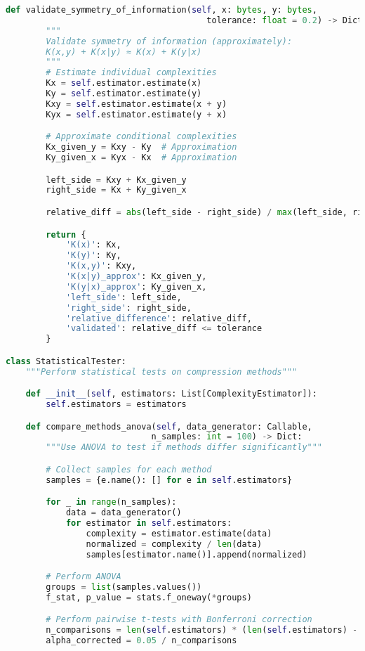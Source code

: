 \documentclass[12pt,a4paper]{report}
\begin{document}
\begin{lstlisting}[language=Python, caption=Validation Testing Protocol]
    def validate_symmetry_of_information(self, x: bytes, y: bytes,
                                        tolerance: float = 0.2) -> Dict:
        """
        Validate symmetry of information (approximately):
        K(x,y) + K(x|y) ≈ K(x) + K(y|x)
        """
        # Estimate individual complexities
        Kx = self.estimator.estimate(x)
        Ky = self.estimator.estimate(y)
        Kxy = self.estimator.estimate(x + y)
        Kyx = self.estimator.estimate(y + x)

        # Approximate conditional complexities
        Kx_given_y = Kxy - Ky  # Approximation
        Ky_given_x = Kyx - Kx  # Approximation

        left_side = Kxy + Kx_given_y
        right_side = Kx + Ky_given_x

        relative_diff = abs(left_side - right_side) / max(left_side, right_side)

        return {
            'K(x)': Kx,
            'K(y)': Ky,
            'K(x,y)': Kxy,
            'K(x|y)_approx': Kx_given_y,
            'K(y|x)_approx': Ky_given_x,
            'left_side': left_side,
            'right_side': right_side,
            'relative_difference': relative_diff,
            'validated': relative_diff <= tolerance
        }

class StatisticalTester:
    """Perform statistical tests on compression methods"""

    def __init__(self, estimators: List[ComplexityEstimator]):
        self.estimators = estimators

    def compare_methods_anova(self, data_generator: Callable,
                             n_samples: int = 100) -> Dict:
        """Use ANOVA to test if methods differ significantly"""

        # Collect samples for each method
        samples = {e.name(): [] for e in self.estimators}

        for _ in range(n_samples):
            data = data_generator()
            for estimator in self.estimators:
                complexity = estimator.estimate(data)
                normalized = complexity / len(data)
                samples[estimator.name()].append(normalized)

        # Perform ANOVA
        groups = list(samples.values())
        f_stat, p_value = stats.f_oneway(*groups)

        # Perform pairwise t-tests with Bonferroni correction
        n_comparisons = len(self.estimators) * (len(self.estimators) - 1) // 2
        alpha_corrected = 0.05 / n_comparisons


\end{lstlisting}
\end{document}
